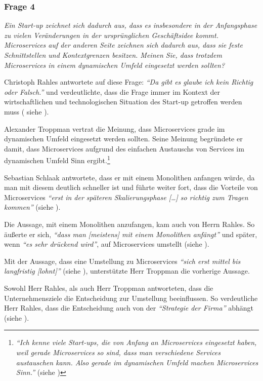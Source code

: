 \subsubsection{Frage 4}
\label{sec:frage4}

\textit{Ein Start-up zeichnet sich dadurch aus, dass es insbesondere in der Anfangsphase zu vielen Veränderungen in der ursprünglichen Geschäftsidee kommt. Microservices auf der anderen Seite zeichnen sich dadurch aus, dass sie feste Schnittstellen und Kontextgrenzen besitzen. Meinen Sie, dass trotzdem Microservices in einem dynamischen Umfeld eingesetzt werden sollten?}

Christoph Rahles antwortete auf diese Frage: \textit{\enquote{Da gibt es glaube ich kein Richtig oder Falsch.}} und verdeutlichte, dass die Frage immer im Kontext der wirtschaftlichen und technologischen Situation des Start-up getroffen werden muss ( siehe ).

Alexander Troppman vertrat die Meinung, dass Microservices grade im dynamischen Umfeld eingesetzt werden sollten. Seine Meinung begründete er damit, dass Microservices aufgrund des einfachen Austauschs von Services im dynamischen Umfeld Sinn ergibt.\footnote{
\textit{\enquote{Ich kenne viele Start-ups, die von Anfang an Microservices eingesetzt haben, weil gerade Microservices so sind, dass man verschiedene Services austauschen kann. Also gerade im dynamischen Umfeld machen Microservices Sinn.}} (siehe )
}

Sebastian Schlaak antwortete, dass er mit einem Monolithen anfangen würde, da man mit diesem deutlich schneller ist und führte weiter fort, dass die Vorteile von Microservices \textit{\enquote{erst in der späteren Skalierungsphase […] so richtig zum Tragen kommen}} (siehe ).

Die Aussage, mit einem Monolithen anzufangen, kam auch von Herrn Rahles. So äußerte er sich, \textit{\enquote{dass man [meistens] mit einem Monolithen anfängt}} und später, wenn \textit{\enquote{es sehr drückend wird}}, auf Microservices umstellt (siehe ).

Mit der Aussage, dass eine Umstellung zu Microservices \textit{\enquote{sich erst mittel bis langfristig [lohnt]}} (siehe ), unterstützte Herr Troppman die vorherige Aussage.

Sowohl Herr Rahles, als auch Herr Troppman antworteten, dass die Unternehmensziele die Entscheidung zur Umstellung beeinflussen. So verdeutliche Herr Rahles, dass die Entscheidung auch von der \textit{\enquote{Strategie der Firma}} abhängt (siehe ).

